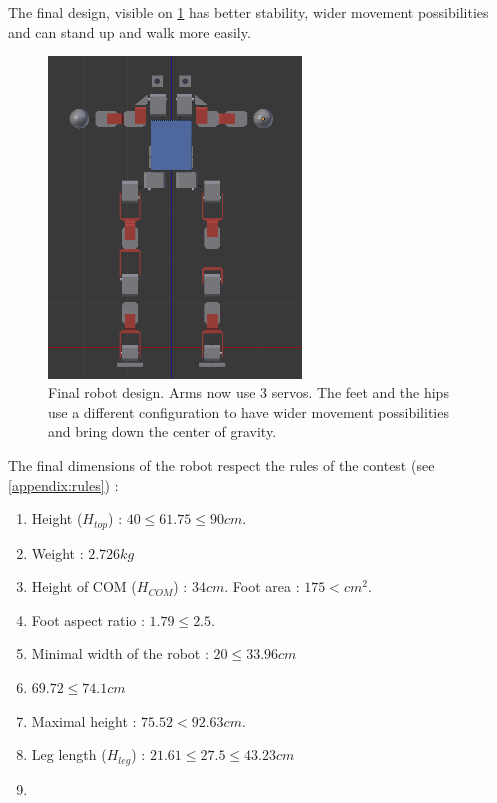 The final design, visible on \cref{fig:final_robot} has better stability, wider movement possibilities and can stand up and walk more easily. 
\begin{figure}[htp]
\center
\includegraphics[width=0.6\textwidth]{figures/robot2}
\caption[Final robot design]{Final robot design. Arms now use 3 servos. The feet and the hips use a different configuration to have wider movement possibilities and bring down the center of gravity.}
\label{fig:final_robot}
\end{figure}

The final dimensions of the robot respect the rules of the contest (see \cref{appendix:rules}) :
\begin{enumerate}
\item Height ($H_{top}$) :  $40 \leq 61.75 \leq 90cm$.
\item Weight : $2.726kg$
\item Height of COM ($H_{COM}$) : $34cm$. Foot area : $175 < cm^2$.
\item Foot aspect ratio : $1.79 \leq 2.5$.
\item Minimal width of the robot : $20 \leq 33.96cm$
\item $69.72 \leq 74.1cm$
\item Maximal height : $75.52 < 92.63cm$.
\item Leg length ($H_{leg}$) : $21.61 \leq 27.5 \leq 43.23cm$
\item 
\end{enumerate}